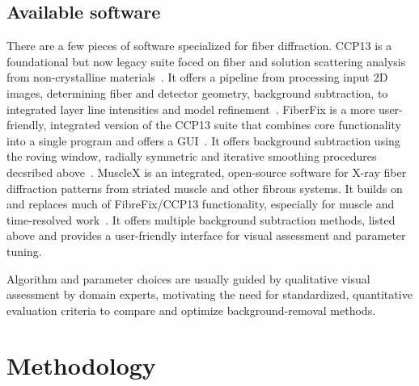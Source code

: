 \documentclass[iucr]{iucrjournals}
\begin{document}

\subsection{Available software}
There are a few pieces of software specialized for fiber diffraction. CCP13 is a foundational but now legacy suite foced on fiber and solution scattering analysis from non-crystalline materials~\cite{squire2003new, squire2003ccp13_software, denny1995ccp13_updates}.
It offers a pipeline from processing input 2D images, determining fiber and detector geometry, background subtraction, to integrated layer line intensities and model refinement~\cite{shotton1998ccp13_software_dev}. FiberFix is a more user-friendly, integrated version of the CCP13 suite that combines core functionality into a single program and offers a GUI~\cite{rajkumar2005fibrefix}. It offers background subtraction using the roving window, radially symmetric and iterative smoothing procedures decsribed above~\cite{HeEtAl2007, fibrefix_diamond}. MuscleX is an integrated, open-source software for X-ray fiber diffraction patterns from striated muscle and other fibrous systems. It builds on and replaces much of FibreFix/CCP13 functionality, especially for muscle and time-resolved work~\cite{JiratrakanvongEtAl2024}. It offers multiple background subtraction methods, listed above and provides a user-friendly interface for visual assessment and parameter tuning. 

Algorithm and parameter choices are usually guided by qualitative visual assessment by domain experts, motivating the need for standardized, quantitative evaluation criteria to compare and optimize background-removal methods.

\section{Methodology}

\end{document}
